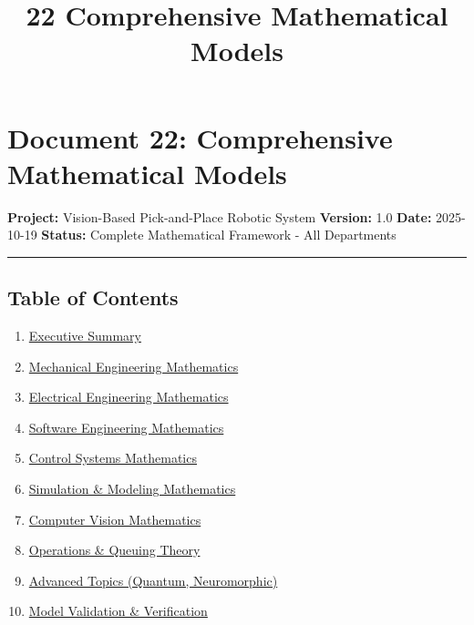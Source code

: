 \documentclass[
]{article}
\title{22 Comprehensive Mathematical Models}
\author{}
\date{}
\providecommand{\tightlist}{%
  \setlength{\itemsep}{0pt}\setlength{\parskip}{0pt}}
\begin{document}
\maketitle

{
\setcounter{tocdepth}{3}
\tableofcontents
}
\hypertarget{document-22-comprehensive-mathematical-models}{%
\section{Document 22: Comprehensive Mathematical
Models}\label{document-22-comprehensive-mathematical-models}}

\textbf{Project:} Vision-Based Pick-and-Place Robotic System
\textbf{Version:} 1.0 \textbf{Date:} 2025-10-19 \textbf{Status:}
Complete Mathematical Framework - All Departments

\begin{center}\rule{0.5\linewidth}{0.5pt}\end{center}

\hypertarget{table-of-contents}{%
\subsection{Table of Contents}\label{table-of-contents}}

\begin{enumerate}
\def\labelenumi{\arabic{enumi}.}
\tightlist
\item
  \protect\hyperlink{1-executive-summary}{Executive Summary}
\item
  \protect\hyperlink{2-mechanical-engineering-mathematics}{Mechanical
  Engineering Mathematics}
\item
  \protect\hyperlink{3-electrical-engineering-mathematics}{Electrical
  Engineering Mathematics}
\item
  \protect\hyperlink{4-software-engineering-mathematics}{Software
  Engineering Mathematics}
\item
  \protect\hyperlink{5-control-systems-mathematics}{Control Systems
  Mathematics}
\item
  \protect\hyperlink{6-simulation--modeling-mathematics}{Simulation \&
  Modeling Mathematics}
\item
  \protect\hyperlink{7-computer-vision-mathematics}{Computer Vision
  Mathematics}
\item
  \protect\hyperlink{8-operations--queuing-theory}{Operations \& Queuing
  Theory}
\item
  \protect\hyperlink{9-advanced-topics-quantum-neuromorphic}{Advanced
  Topics (Quantum, Neuromorphic)}
\item
  \protect\hyperlink{10-model-validation--verification}{Model Validation
  \& Verification}
\end{enumerate}
\end{document}
